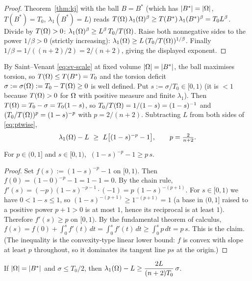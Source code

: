 \begin{proof}
Theorem~\ref{thm:kj} with the ball $B=B^*$ (which has $\left|B^*\right|=\left|\Omega\right|$,
$T(B^*)=T_0$, $\lambda_1(B^*)=L$) reads
$T(\Omega)\,\lambda_1(\Omega)^\beta\ge T(B^*)\,\lambda_1(B^*)^\beta=T_0 L^\beta$.
Divide by $T(\Omega)>0$:
$\lambda_1(\Omega)^\beta\ge L^\beta\,T_0/T(\Omega)$. Raise both nonnegative sides
to the power $1/\beta>0$ (strictly increasing):
$\lambda_1(\Omega)\ge L\,(T_0/T(\Omega))^{1/\beta}$. Finally $1/\beta=1/((n+2)/2)
=2/(n+2)$, giving the displayed exponent.
\end{proof}

By Saint--Venant \eqref{eq:sv-scale} at fixed volume $\left|\Omega\right|=\left|B^*\right|$, the
ball maximises torsion, so $T(\Omega)\le T(B^*)=T_0$ and the torsion deficit
$\sigma:=\sigma(\Omega):=T_0-T(\Omega)\ge0$ is well defined. Put
$s:=\sigma/T_0\in[0,1)$ (it is $<1$ because $T(\Omega)>0$ for $\Omega$ with
positive measure and finite $\lambda_1$). Then
$T(\Omega)=T_0-\sigma=T_0(1-s)$, so $T_0/T(\Omega)=1/(1-s)=(1-s)^{-1}$ and
$(T_0/T(\Omega))^{p}=(1-s)^{-p}$ with $p=2/(n+2)$. Subtracting $L$ from both
sides of \eqref{eq:ptwise},
\begin{equation}\label{eq:ptwise-s}
  \lambda_1(\Omega)-L\ \ge\ L\bigl[(1-s)^{-p}-1\bigr],\qquad p=\tfrac{2}{n+2}.
\end{equation}

\begin{lemma}\label{lem:onevar}
For $p\in(0,1]$ and $s\in[0,1)$, $\ (1-s)^{-p}-1\ge p\,s$.
\end{lemma}

\begin{proof}
Set $f(s):=(1-s)^{-p}-1$ on $[0,1)$. Then $f(0)=(1-0)^{-p}-1=1-1=0$. By the
chain rule, $f'(s)=(-p)(1-s)^{-p-1}\cdot(-1)=p\,(1-s)^{-(p+1)}$. For
$s\in[0,1)$ we have $0<1-s\le1$, so $(1-s)^{-(p+1)}\ge1^{-(p+1)}=1$ (a base
in $(0,1]$ raised to a positive power $p+1>0$ is at most $1$, hence its
reciprocal is at least $1$). Therefore $f'(s)\ge p$ on $[0,1)$. By the
fundamental theorem of calculus, $f(s)=f(0)+\int_0^s f'(t)\,dt
=\int_0^s f'(t)\,dt\ge\int_0^s p\,dt=p\,s$. This is the claim. (The
inequality is the convexity-type linear lower bound: $f$ is convex with
slope at least $p$ throughout, so it dominates its tangent line $ps$ at the
origin.)
\end{proof}

\begin{lemma}\label{lem:small}
If $\left|\Omega\right|=\left|B^*\right|$ and $\sigma\le T_0/2$, then
$\displaystyle\lambda_1(\Omega)-L\ge\frac{2L}{(n+2)T_0}\,\sigma$.
\end{lemma}

